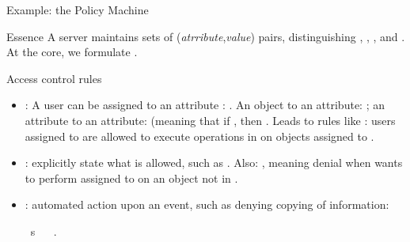\begin{slide}{Example: the Policy Machine}
  \begin{block}{Essence}
    A server maintains sets of (\emph{atrribute},\emph{value}) pairs, distinguishing ,
    , , and . At the core, we formulate . 
  \end{block}
  \begin{block}{Access control rules}
    \begin{itemize}
    \item {}: A user  can be assigned to an attribute : . An object to an attribute: ; an attribute to
      an attribute:  (meaning that if , then . Leads to rules like
      : users assigned to  are allowed to execute
      operations in  on objects assigned to .
    \item {}: explicitly state what is  allowed, such as
      . Also:
      , meaning denial when  wants to perform 
      assigned to  on an object not in .
    \item {}: automated action upon an event, such as denying copying of information:
      \begin{center}
         \ s\  \ %
        .
      \end{center}
    \end{itemize}
  \end{block}
\end{slide}
